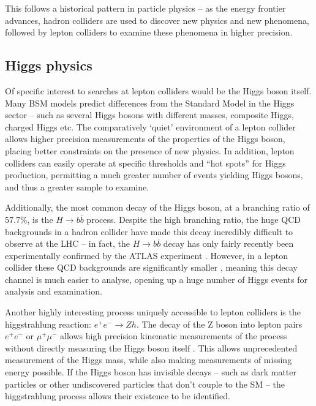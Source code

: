 This follows a historical pattern in particle physics -- as the energy frontier advances, hadron colliders are used to discover new physics and new phenomena, followed by lepton colliders to examine these phenomena in higher precision.

\subsection{Higgs physics}
Of specific interest to searches at lepton colliders would be the Higgs boson itself. Many \acrshort{BSM} models predict differences from the Standard Model in the Higgs sector -- such as several Higgs bosons with different masses, composite Higgs, charged Higgs etc. The comparatively `quiet' environment of a lepton collider allows higher precision measurements of the properties of the Higgs boson, placing better constraints on the presence of new physics. In addition, lepton colliders can easily operate at specific thresholds and ``hot spots'' for Higgs production, permitting a much greater number of events yielding Higgs bosons, and thus a greater sample to examine.

Additionally, the most common decay of the Higgs boson, at a branching ratio of 57.7\%, is the $H \rightarrow b \overline{b}$ process. Despite the high branching ratio, the huge \acrshort{QCD} backgrounds in a hadron collider have made this decay incredibly difficult to observe at the LHC -- in fact, the $H \rightarrow b \overline{b}$ decay has only fairly recently been experimentally confirmed by the \acrshort{ATLAS} experiment \cite{hbb-atlas}. However, in a lepton collider these \acrshort{QCD} backgrounds are significantly smaller \cite{ilc-tdr-physics}, meaning this decay channel is much easier to analyse, opening up a huge number of Higgs events for analysis and examination.

Another highly interesting process uniquely accessible to lepton colliders is the higgstrahlung reaction: $e^+ e^- \rightarrow Zh$. The decay of the Z boson into lepton pairs $e^+ e^-$ or $\mu^+ \mu^-$ allows high precision kinematic measurements of the process without directly measuring the Higgs boson itself \cite{ilc-tdr-physics}. This allows unprecedented measurement of the Higgs mass, while also making measurements of missing energy possible. If the Higgs boson has invisible decays -- such as dark matter particles or other undiscovered particles that don't couple to the \acrshort{SM} -- the higgstrahlung process allows their existence to be identified.

